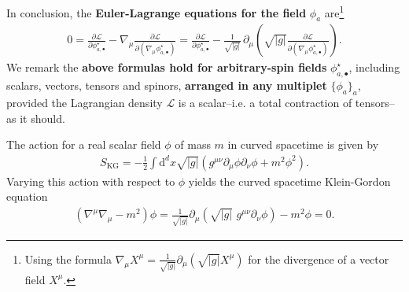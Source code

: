 \documentclass[../geometry_main.tex]{subfiles}
\begin{document}
\begin{mytheorem}
In conclusion, the \textbf{Euler-Lagrange equations for the field} $\phi_a$ are\footnote{Using the formula $\nabla_\mu X^\mu = \frac{1}{\sqrt{|g|}}\partial_\mu (\sqrt{|g|} X^\mu)$ for the divergence of a vector field $X^\mu$.}
\begin{align}
    0= \frac{\partial\mathcal{L}}{\partial\phi^\star_{a,\bullet}}-\nabla_\mu \frac{\partial \mathcal{L}}{\partial (\nabla_\mu \phi_{a,\bullet}^\star)}
    =\frac{\partial\mathcal{L}}{\partial\phi^\star_{a,\bullet}}-\frac{1}{\sqrt{|g|}} \,\partial_\mu \left( \sqrt{|g|} \frac{\partial \mathcal{L}}{\partial (\nabla_\mu \phi_{a,\bullet}^\star)} \right).
\end{align}
We remark the \textbf{above formulas hold for arbitrary-spin fields} $\phi^{\star}_{a,\bullet}$, including scalars, vectors, tensors and spinors, \textbf{arranged in any multiplet} $\{\phi_a\}_a$, provided the Lagrangian density $\mathcal{L}$ is a scalar--i.e. a total contraction of tensors--as it should.
\end{mytheorem}



\begin{mytheorem}
The action for a real scalar field $\phi$ of mass $m$ in curved spacetime is given by
\begin{align}
    S_\text{KG} = -\frac{1}{2} \int \mathrm{d}^d x \sqrt{|g|} \left( g^{\mu\nu} \partial_\mu \phi \partial_\nu \phi + m^2 \phi^2 \right).
\end{align}
Varying this action with respect to $\phi$ yields the curved spacetime Klein-Gordon equation
\begin{align}
    (\nabla^\mu \nabla_\mu - m^2) \phi = \frac{1}{\sqrt{|g|}} \partial_\mu \left( \sqrt{|g|}\,\, g^{\mu\nu} \partial_\nu \phi \right) - m^2 \phi = 0.
\end{align}
%   
\end{mytheorem}
\end{document}
